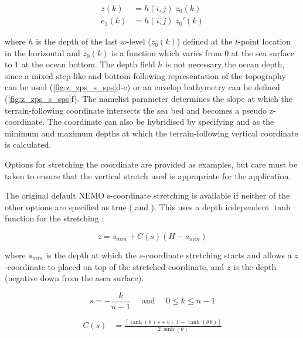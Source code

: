 \documentclass[../tex_main/NEMO_manual]{subfiles}
\begin{document}
\begin{equation} \label{eq:DOM_sco_ana}
\begin{split}
 z(k) 		&= h(i,j) \; z_0(k)	\\
 e_3(k)	&= h(i,j) \; z_0'(k)
\end{split}
\end{equation}

where $h$ is the depth of the last $w$-level ($z_0(k)$) defined at the $t$-point 
location in the horizontal and $z_0(k)$ is a function which varies from $0$ at the sea 
surface to $1$ at the ocean bottom. The depth field $h$ is not necessary the ocean 
depth, since a mixed step-like and bottom-following representation of the 
topography can be used (\autoref{fig:z_zps_s_sps}d-e) or an envelop bathymetry can be defined (\autoref{fig:z_zps_s_sps}f).
The namelist parameter  determines the slope at which the terrain-following coordinate intersects 
the sea bed and becomes a pseudo z-coordinate. 
The coordinate can also be hybridised by specifying  and  
as the minimum and maximum depths at which the terrain-following vertical coordinate is calculated.

Options for stretching the coordinate are provided as examples, but care must be taken to ensure 
that the vertical stretch used is appropriate for the application.

The original default NEMO s-coordinate stretching is available if neither of the other options 
are specified as true ( and ). 
This uses a depth independent $\tanh$ function for the stretching \citep{Madec_al_JPO96}:

\begin{equation}
  z = s_{min}+C\left(s\right)\left(H-s_{min}\right)
  \label{eq:SH94_1}
\end{equation}

where $s_{min}$ is the depth at which the $s$-coordinate stretching starts and 
allows a $z$-coordinate to placed on top of the stretched coordinate, 
and $z$ is the depth (negative down from the asea surface).

\begin{equation}
  s = -\frac{k}{n-1} \quad \text{ and } \quad 0 \leq k \leq n-1
  \label{eq:DOM_s}
\end{equation}

\begin{equation} \label{eq:DOM_sco_function}
\begin{split}
C(s)	&=  \frac{ \left[	  \tanh{ \left( \theta \, (s+b) \right)} 
	  	 			- \tanh{ \left(  \theta \, b      \right)}  \right]}
		      {2\;\sinh \left( \theta \right)}
\end{split}
\end{equation}
\end{document}

